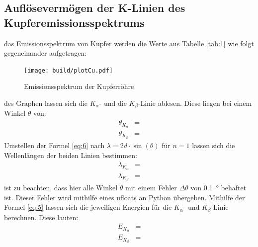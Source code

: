 \subsection{Auflösevermögen der K-Linien des Kupferemissionsspektrums}

    \justifying das Emissionsspektrum von Kupfer werden die Werte aus Tabelle \ref{tab:1} wie folgt gegeneinander aufgetragen:

    \begin{figure}[H]
        \centering
        \texttt{[image: build/plotCu.pdf]}
        \caption{Emissionsspektrum der Kupferröhre}
        \label{fig:3}
    \end{figure}

    \justifying des Graphen lassen sich die $K_{\alpha}$- und die $K_{\beta}$-Linie ablesen. Diese liegen bei einem
    Winkel $\theta$ von:
    \begin{subequations}\label{eq:11}
    \begin{align}
        \theta_{K_{\alpha}} &= \text{} \label{eq:11a}\\
        \theta_{K_{\beta}} &= \text{} \label{eq:11b}
    \end{align}
    \end{subequations}
    \justifying Umstellen der Formel \eqref{eq:6} nach $\lambda = 2d\cdot\sin(\theta)$ für $n=1$ lassen sich die Wellenlängen 
    der beiden Linien bestimmen: 
    \begin{subequations}\label{eq:12}
    \begin{align}
        \lambda_{K_{\alpha}} &= \text{} \label{eq:12a}\\
        \lambda_{K_{\beta}} &= \text{} \label{eq:12b}
    \end{align}
    \end{subequations}
    \justifying ist zu beachten, dass hier alle Winkel $\theta$ mit einem Fehler $\Delta \theta$ von \SI{0.1}{\degree} behaftet ist.
    Dieser Fehler wird mithilfe eines ufloats \cite{uncertainties} an Python übergeben. 
    Mithilfe der Formel \eqref{eq:5} lassen sich die jeweiligen Energien für die $K_{\alpha}$- und $K_{\beta}$-Linie
    berechnen. Diese lauten:
    \begin{subequations}\label{eq:13}
    \begin{align}
        E_{K_{\alpha}} &= \text{} \label{eq:13a}\\
        E_{K_{\beta}} &= \text{} \label{eq:13b}
    \end{align}
    \end{subequations}
